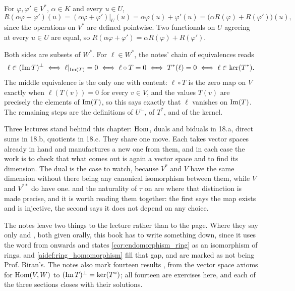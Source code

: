 \begin{exercisesolution}
\label{sol:restriction_linear}
For $\varphi, \varphi' \in V^*$, $\alpha \in K$ and every $u \in U$,
\[
R(\alpha \varphi + \varphi')(u) = (\alpha \varphi + \varphi')|_U(u) = \alpha \varphi(u) + \varphi'(u) = \big(\alpha R(\varphi) + R(\varphi')\big)(u),
\]
since the operations on $V^*$ are defined pointwise. Two functionals on $U$ agreeing at every $u \in U$ are equal, so $R(\alpha \varphi + \varphi') = \alpha R(\varphi) + R(\varphi')$.
\end{exercisesolution}

\begin{exercisesolution}
\label{sol:annihilator_image_kernel_dual}
Both sides are subsets of $W^*$. For $\ell \in W^*$, the notes' chain of equivalences reads
\[
\ell \in (\operatorname{Im} T)^\perp \iff \ell|_{\operatorname{Im}(T)} = 0 \iff \ell \circ T = 0 \iff T^*(\ell) = 0 \iff \ell \in \ker(T^*).
\]
The middle equivalence is the only one with content: $\ell \circ T$ is the zero map on $V$ exactly when $\ell(T(v)) = 0$ for every $v \in V$, and the values $T(v)$ are precisely the elements of $\operatorname{Im}(T)$, so this says exactly that $\ell$ vanishes on $\operatorname{Im}(T)$. The remaining steps are the definitions of $U^\perp$, of $T^*$, and of the kernel.
\end{exercisesolution}



\begin{ainote}
Three lectures stand behind this chapter: $\operatorname{Hom}$, duals and biduals in 18.a,
direct sums in 18.b, quotients in 18.c. They share one move. Each takes vector
spaces already in hand and manufactures a new one from them, and in each case
the work is to check that what comes out is again a vector space and to find its
dimension. The dual is the case to watch, because $V^*$ and $V$ have the same
dimension without there being any canonical isomorphism between them, while $V$
and $V^{**}$ do have one.  and the naturality of
$\tau$ on  are where that distinction is made
precise, and it is worth reading them together: the first says the map exists
and is injective, the second says it does not depend on any choice.

The notes leave two things to the lecture rather than to the page. Where they
say only  and , both given orally, this book has to write something
down, since it uses the word from  onwards and states
\cref{cor:endomorphism_ring} as an isomorphism of rings.  and
\cref{aidef:ring_homomorphism} fill that gap, and are marked as not being Prof.
Biran's. The notes also mark fourteen results , from the vector space
axioms for $\operatorname{Hom}(V,W)$ to $(\operatorname{Im} T)^\perp = \ker(T^*)$; all fourteen are
exercises here, and each of the three sections closes with their solutions.
\end{ainote}


